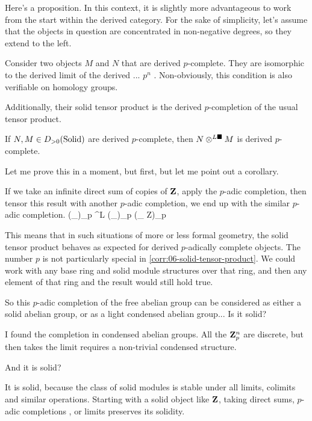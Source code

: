 Here's a proposition. In this context, it is slightly more advantageous to work from the start within the derived category. For the sake of simplicity, let's assume that the objects in question are concentrated in non-negative degrees, so they extend to the left.

Consider two objects $M$ and $N$ that are derived $p$-complete. They are isomorphic to the derived limit of the derived ... $p^n$ .  
Non-obviously, this condition is also verifiable on homology groups.

Additionally, their solid tensor product is the derived $p$-completion of the usual tensor product.

\bp \label{prop:06-solid-tensor-product-derived-p-complete}
If $N, M \in D_{>0}(\mathrm{Solid})$ are derived $p$-complete, then $N \otimes^{L\blacksquare} M$ is derived $p$-complete.
\ep

Let me prove this in a moment, but first, but let me point out a corollary.

\bc \label{corr:06-infinite-direct-sum-of-copies}
If we take an infinite direct sum of copies of $\mathbf Z$, apply the $p$-adic completion, then tensor this result with another $p$-adic completion, we end up with the similar $p$-adic completion.
\be \label{corr:06-solid-tensor-product}
(\bigoplus_\N \Z)_p \tnsr^{L\solid} (\bigoplus_\N \Z)_p \simeq (\bigoplus_{\N \times \N} Z)_p
\ee
\ec

This means that in such situations of more or less formal geometry, the solid tensor product behaves as expected for derived $p$-adically complete objects. The number $p$ is not particularly special in \ref{corr:06-solid-tensor-product}. We could work with any base ring and solid module structures over that ring, and then any element of that ring and the result would still hold true.



\ques So this $p$-adic completion of the free abelian group can be considered as either a solid abelian group, or as a light condensed abelian group... Is it solid?

\ans I found the completion in condensed abelian groups. All the $\mathbf Z^n_p$ are discrete, but then takes the limit requires a non-trivial condensed structure.

\ques And it is solid?

\ans It is solid, because the class of solid modules is stable under all limits, colimits and similar operations. Starting with a solid object like $\mathbf Z$, taking direct sums, $p$-adic completions , or limits preserves its solidity.

